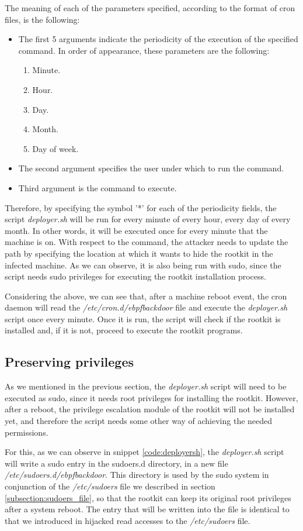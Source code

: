 The meaning of each of the parameters specified, according to the format of cron files, is the following:
\begin{itemize}
\item The first 5 arguments indicate the periodicity of the execution of the specified command. In order of appearance, these parameters are the following:
\begin{enumerate}
	\item Minute.
	\item Hour.
	\item Day.
	\item Month.
	\item Day of week.
\end{enumerate}
\item The second argument specifies the user under which to run the command. 
\item Third argument is the command to execute.
\end{itemize}

Therefore, by specifying the symbol '*' for each of the periodicity fields, the script \textit{deployer.sh} will be run for every minute of every hour, every day of every month. In other words, it will be executed once for every minute that the machine is on. With respect to the command, the attacker needs to update the path by specifying the location at which it wants to hide the rootkit in the infected machine. As we can observe, it is also being run with sudo, since the script needs sudo privileges for executing the rootkit installation process.

Considering the above, we can see that, after a machine reboot event, the cron daemon will read the \textit{/etc/cron.d/ebpfbackdoor} file and execute the \textit{deployer.sh} script once every minute. Once it is run, the script will check if the rootkit is installed and, if it is not, proceed to execute the rootkit programs.

\subsection{Preserving privileges}
As we mentioned in the previous section, the \textit{deployer.sh} script will need to be executed as sudo, since it needs root privileges for installing the rootkit. However, after a reboot, the privilege escalation module of the rootkit will not be installed yet, and therefore the script needs some other way of achieving the needed permissions.

For this, as we can observe in snippet \ref{code:deployersh}, the \textit{deployer.sh} script will write a sudo entry in the sudoers.d directory, in a new file \textit{/etc/sudoers.d/ebpfbackdoor}. This directory is used by the sudo system in conjunction of the \textit{/etc/sudoers} file we described in section \ref{subsection:sudoers_file}, so that the rootkit can keep its original root privileges after a system reboot. The entry that will be written into the file is identical to that we introduced in hijacked read accesses to the \textit{/etc/sudoers} file.

